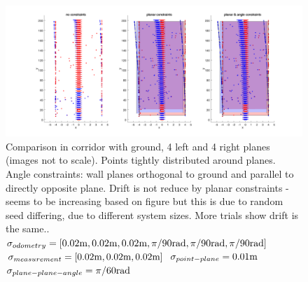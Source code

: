 \documentclass[a4paper,11pt]{article}
\begin{document}
\begin{figure}
\centering
\includegraphics[width=1.15\textwidth,trim={3cm 0 0 0},clip]{segmentedCorridorLowNoise.png}
\caption{\label{fig:segmentedCorridorLowNoise} Comparison in corridor with ground, 4 left and 4 right planes (images not to scale). Points tightly distributed around planes. Angle constraints: wall planes orthogonal to ground and parallel to directly opposite plane. Drift is not reduce by planar constraints - seems to be increasing based on figure but this is due to random seed differing, due to different system sizes. More trials show drift is the same..\newline
$\sigma_{odometry} = [0.02\textnormal{m},0.02\textnormal{m},0.02\textnormal{m},
\pi/90\textnormal{rad},\pi/90\textnormal{rad},\pi/90\textnormal{rad}]$\newline
$\sigma_{measurement} = [0.02\textnormal{m},0.02\textnormal{m},0.02\textnormal{m}]$\newline
$\sigma_{point-plane} = 0.01\textnormal{m}$\newline
$\sigma_{plane-plane-angle} = \pi/60\textnormal{rad}$}
\end{figure}
\end{document}
